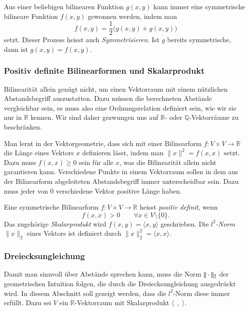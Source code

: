 Aus einer beliebigen bilinearen Funktion $g(x,y)$ kann immer eine
symmetrische bilineare Funktion $f(x,y)$ gewonnen werden, indem
man 
\[
f(x,y) = \frac12 \bigl(g(x,y)+g(x,y)\bigr)
\]
setzt.
Dieser Prozess heisst auch {\em Symmetrisieren}.
%
Ist $g$ bereits symmetrische, dann ist $g(x,y)=f(x,y)$.

\subsubsection{Positiv definite Bilinearformen und Skalarprodukt}
Bilinearität allein genügt nicht, um einen Vektorraum mit einem
nützlichen Abstandsbegriff auszustatten.
Dazu müssen die berechneten Abstände vergleichbar sein, es muss also
eine Ordnungsrelation definiert sein, wie wir sie nur in $\mathbb{R}$
kennen.
Wir sind daher gezwungen uns auf $\mathbb{R}$- oder
$\mathbb{Q}$-Vektorräume zu beschränken.

Man lernt in der Vektorgeometrie, dass sich mit einer Bilinearform
$f\colon V\times V\to\mathbb{R}$ 
die Länge eines Vektors $x$ definieren lässt, indem man $\|x\|^2 = f(x,x)$
setzt.
Dazu muss $f(x,x)\ge 0$ sein für alle $x$, was die Bilinearität
allein nicht garantieren kann.
Verschiedene Punkte in einem Vektorraum sollen in dem aus der Bilinearform
abgeleiteten Abstandsbegriff immer unterscheidbar sein.
Dazu muss jeder von $0$ verschiedene Vektor positive Länge haben.

\begin{definition}
Eine symmetrische Bilinearform $f\colon V\times V\to\mathbb{R}$
heisst {\em positiv definit}, wenn
%
\[
f(x,x) > 0\qquad\forall x\in V\setminus\{0\}.
\]
Das zugehörige {\em Skalarprodukt} wird $f(x,y)=\langle x,y\rangle$
geschrieben.
%
Die {\em $l^2$-Norm} $\|x\|_2$ eines Vektors ist definiert durch
$\|x\|_2^2 = \langle x,x\rangle$.
%
\end{definition}

\subsubsection{Dreiecksungleichung}
Damit man sinnvoll über Abstände sprechen kann, muss die Norm
$\|\mathstrut\cdot\mathstrut\|_2$
der geometrischen Intuition folgen, die durch
die Dreiecksungleichung ausgedrückt wird.
In diesem Abschnitt soll gezeigt werden, dass die $l^2$-Norm
diese immer erfüllt.
Dazu sei $V$ ein $\mathbb{R}$-Vektorraum mit Skalarprodukt
$\langle\;\,,\;\rangle$.

